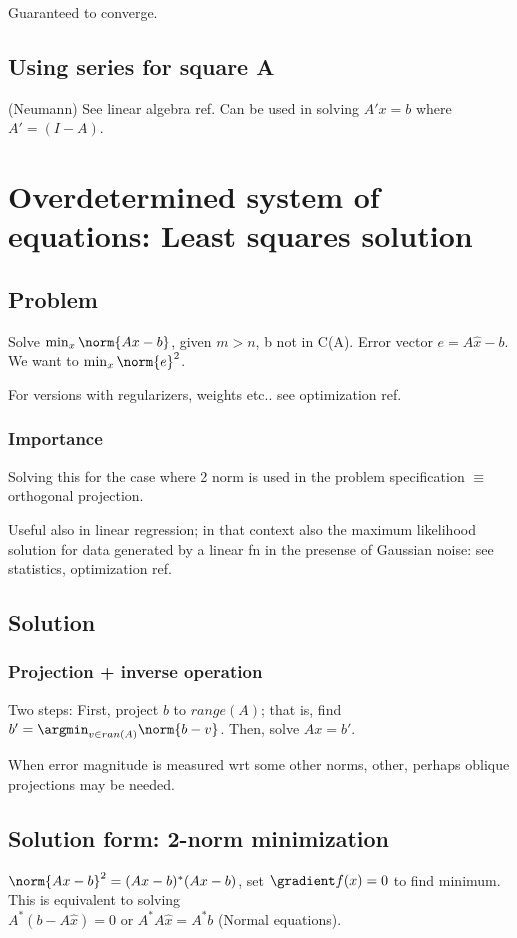 \documentclass[oneside, article]{memoir}
\begin{document}
Guaranteed to converge.

\section{Using  series for square A}
(Neumann) See linear algebra ref. Can be used in solving $A'x = b$ where $A' = (I-A)$.

\chapter{Overdetermined system of equations: Least squares solution}
\section{Problem}
Solve $\min_x \norm{Ax-b}$, given $m>n$, b not in C(A). Error vector $e=A\hat{x}-b$. We want to $\min_x \norm{e}^{2}$.

For versions with regularizers, weights etc.. see optimization ref.

\subsection{Importance}
Solving this for the case where 2 norm is used in the problem specification $\equiv$ orthogonal projection.

Useful also in linear regression; in that context also the maximum likelihood solution for data generated by a linear fn in the presense of Gaussian noise: see statistics, optimization ref.

\section{Solution}
\subsection{Projection + inverse operation}
Two steps: First, project $b$ to $range(A)$; that is, find \\$b' = \argmin_{v \in ran(A)} \norm{b-v}$. Then, solve $Ax = b'$.

When error magnitude is measured wrt some other norms, other, perhaps oblique projections may be needed.

\section{Solution form: 2-norm minimization}
$\norm{Ax-b}^{2} = (Ax-b)^{*}(Ax-b)$, set $\gradient f(x) = 0$ to find minimum. This is equivalent to solving \\
$A^{*}(b-A\hat{x})=0$ or $A^{*}A\hat{x}=A^{*}b$ (Normal equations).
\end{document}
